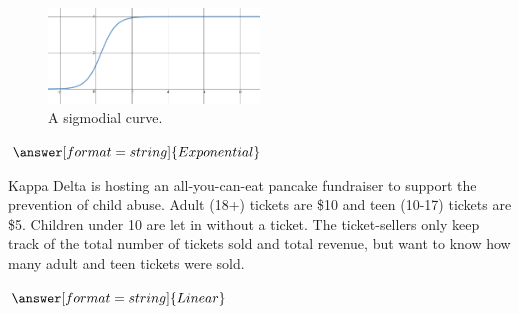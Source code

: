 \documentclass{ximera}
\begin{document}
\begin{question}

\begin{figure}
	\includegraphics[width=0.5\textwidth]{logarithmicGrowth.png}
	\caption{A sigmodial curve.}
\end{figure}

$\answer[format=string]{Exponential}$

\end{question}

\begin{question}
Kappa Delta is hosting an all-you-can-eat pancake fundraiser to support the prevention of child abuse. Adult (18+) tickets are \$10 and teen (10-17) tickets are \$5. Children under 10 are let in without a ticket. The ticket-sellers only keep track of the total number of tickets sold and total revenue, but want to know how many adult and teen tickets were sold. 

$\answer[format=string]{Linear}$

\end{question}
\end{document}
